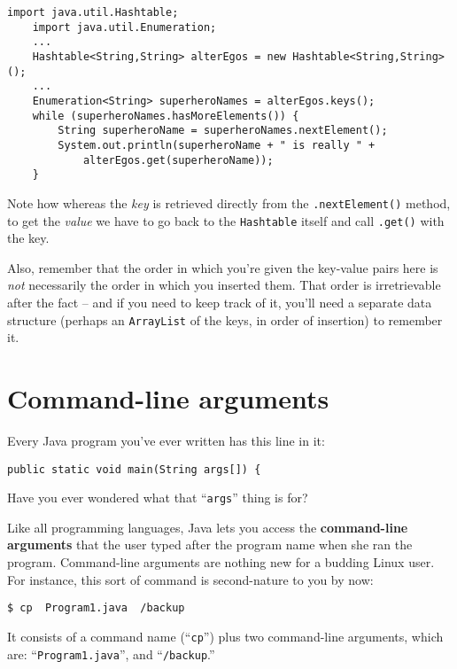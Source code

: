 \begin{Verbatim}[fontsize=\small,samepage=true,frame=single]
    import java.util.Hashtable;
    import java.util.Enumeration;
    ...
    Hashtable<String,String> alterEgos = new Hashtable<String,String>();
    ...
    Enumeration<String> superheroNames = alterEgos.keys();
    while (superheroNames.hasMoreElements()) {
        String superheroName = superheroNames.nextElement();
        System.out.println(superheroName + " is really " +
            alterEgos.get(superheroName));
    }
\end{Verbatim}

Note how whereas the \textit{key} is retrieved directly from the
\texttt{.nextElement()} method, to get the \textit{value} we have to go back
to the \texttt{Hashtable} itself and call \texttt{.get()} with the key.

Also, remember that the order in which you're given the key-value pairs here
is \textit{not} necessarily the order in which you inserted them. That order
is irretrievable after the fact -- and if you need to keep track of it, you'll
need a separate data structure (perhaps an \texttt{ArrayList} of the keys, in
order of insertion) to remember it.

\section{Command-line arguments}

Every Java program you've ever written has this line in it:

\begin{Verbatim}[fontsize=\footnotesize,samepage=true,frame=single]
    public static void main(String args[]) {
\end{Verbatim}

Have you ever wondered what that ``\texttt{args}'' thing is for?

Like all programming languages, Java lets you access the \textbf{command-line
arguments} that the user typed after the program name when she ran the
program. Command-line arguments are nothing new for a budding Linux user. For
instance, this sort of command is second-nature to you by now:

\medskip
\quad \texttt{\$ cp \ Program1.java \ \freakingtilde/backup }
\medskip

It consists of a command name (``\texttt{cp}'') plus two command-line
arguments, which are: ``\texttt{Program1.java}'', and
``\texttt{\freakingtilde/backup}.''

